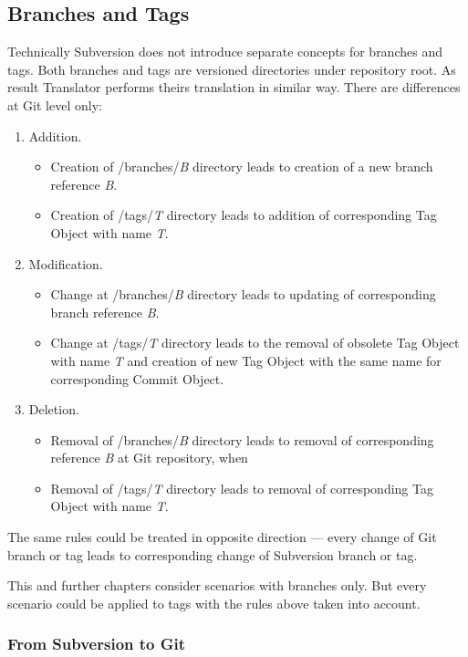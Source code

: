 \subsection{Branches and Tags}

Technically Subversion does not introduce separate concepts for branches and tags. Both branches and tags are versioned directories under repository root. As result Translator performs theirs translation in similar way. There are differences at Git level only:
\begin{enumerate}
	\compactlist
	\item Addition.
	\begin{itemize}
		\item Creation of /branches/\emph{B} directory leads to creation of a new branch reference \emph{B}.
		\item Creation of /tags/\emph{T} directory leads to addition of corresponding Tag Object with name \emph{T}.
	\end{itemize}
	\item Modification.
	\begin{itemize}
		\item Change at /branches/\emph{B} directory leads to updating of corresponding branch reference \emph{B}.
		\item Change at /tags/\emph{T} directory leads to the removal of obsolete Tag Object with name \emph{T} and creation of new Tag Object with the same name for corresponding Commit Object.
	\end{itemize}
	\item Deletion.
	\begin{itemize}
		\item Removal of /branches/\emph{B} directory leads to removal of corresponding reference \emph{B} at Git repository, when
		\item Removal of /tags/\emph{T} directory leads to removal of corresponding Tag Object with name \emph{T}.
	\end{itemize}
\end{enumerate}

The same rules could be treated in opposite direction --- every change of Git branch or tag leads to corresponding change of Subversion branch or tag.

This and further chapters consider scenarios with branches only. But every scenario could be applied to tags with the rules above taken into account.

\subsubsection{From Subversion to Git}

